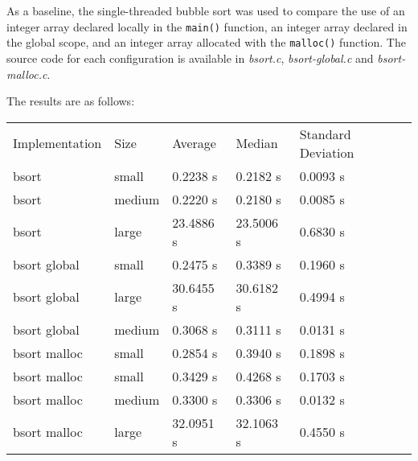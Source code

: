 \documentclass{article}
\begin{document}
As a baseline, the single-threaded bubble sort was used to compare the
use of an integer array declared locally in the \texttt{main()}
function, an integer array declared in the global scope, and an
integer array allocated with the \texttt{malloc()} function. The
source code for each configuration is available in \textit{bsort.c},
\textit{bsort-global.c} and \textit{bsort-malloc.c}. 

The results are as follows:
\begin{center}
\begin{tabular}{lllll}
 Implementation  &  Size & Average  &  Median     &  Standard Deviation             \\
 bsort           &  small    &  0.2238 s   &  0.2182 s            &  0.0093 s  \\
 bsort           &  medium   &  0.2220 s   &  0.2180 s            &  0.0085 s  \\
 bsort           &  large    &  23.4886 s  &  23.5006 s           &  0.6830 s  \\
 bsort global    &  small    &  0.2475 s   &  0.3389 s            &
 0.1960 s  \\
bsort global    &  large    &  30.6455 s  &  30.6182 s           &  0.4994 s  \\
 bsort global    &  medium   &  0.3068 s   &  0.3111 s            &  0.0131 s  \\
 bsort malloc    &  small    &  0.2854 s   &  0.3940 s            &  0.1898 s  \\
 bsort malloc    &  small    &  0.3429 s   &  0.4268 s            &  0.1703 s  \\
 bsort malloc    &  medium   &  0.3300 s   &  0.3306 s            &
 0.0132 s  \\
bsort malloc    &  large    &  32.0951 s  &  32.1063 s           &  0.4550 s  \\
\end{tabular}
\end{center}




\nocite{*}
\end{document}

